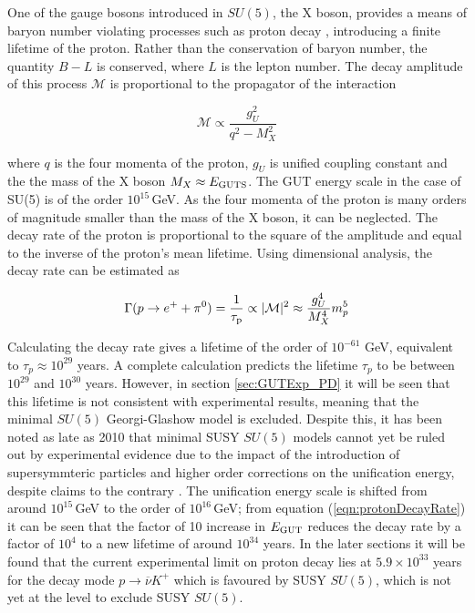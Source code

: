 \documentclass{article}
\begin{document}
One of the gauge bosons introduced in $SU(5)$, the X boson, provides a means of baryon number violating processes such as proton decay \cite{SU5ProtonDecay}, introducing a finite lifetime of the proton. Rather than the conservation of baryon number, the quantity $B-L$ is conserved, where $L$ is the lepton number. The decay amplitude of this process $\mathcal{M}$ is proportional to the propagator of the interaction 

\begin{equation}
\label{eqn:protonDecayAmplitude}
    \mathcal{M} \propto \frac{g^2 _U}{q^2 - M^2 _X}
\end{equation}

where $q$ is the four momenta of the proton, $g_U$ is unified coupling constant and the the mass of the X boson $M_X\approx E_{\rm{GUTS}}$. The GUT energy scale in the case of SU(5) is of the order $10^{15}\,$GeV. As the four momenta of the proton is many orders of magnitude smaller than the mass of the X boson, it can be neglected. The decay rate of the proton is proportional to the square of the amplitude and equal to the inverse of the proton's mean lifetime. Using dimensional analysis, the decay rate can be estimated as

\begin{equation}
\label{eqn:protonDecayRate}
    \Gamma(p\rightarrow e^+ + \pi^0)=\frac{1}{\tau_{\rm{p}}}\propto|\mathcal{M}|^2 \approx \frac{g^4 _U}{M^4 _X}m^5 _p
\end{equation}

Calculating the decay rate gives a lifetime of the order of $10^{-61}$ GeV, equivalent to $\tau_p \approx 10^{29}$ years. A complete calculation predicts the lifetime $\tau_p$ to be between $10^{29}$ and $10^{30}$ years. However, in section \ref{sec:GUTExp_PD} it will be seen that this lifetime is not consistent with experimental results, meaning that the minimal $SU(5)$ Georgi-Glashow model is excluded. 
Despite this, it has been noted as late as 2010 that minimal SUSY $SU(5)$ models  cannot yet be ruled out by experimental evidence \cite{SuperK2014} due to the impact of the introduction of supersymmteric particles and higher order corrections on the unification energy\cite{SUSYSU5Decay}, despite claims to the contrary \cite{PDMinimalSUSYSU5}. The unification energy scale is shifted from around $10^{15}\,$GeV to the order of $10^{16}\,$GeV; from equation (\ref{eqn:protonDecayRate}) it can be seen that the factor of 10 increase in $E_{\rm{GUT}}$ reduces the decay rate by a factor of $10^4$ to a new lifetime of around $10^{34}$ years. In the later sections it will be found that the current experimental limit on proton decay lies at $5.9\times10^{33}$ years for the decay mode $p\rightarrow \overline{\nu}K^+$ which is favoured by SUSY $SU(5)$, which is not yet at the level to exclude SUSY $SU(5)$.
\end{document}
